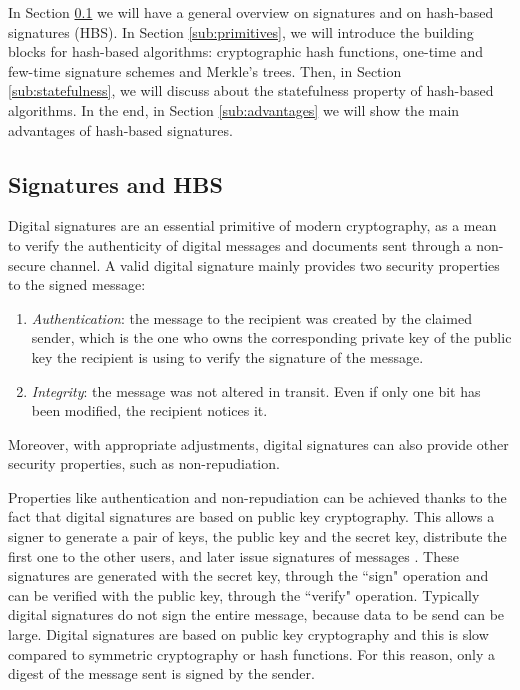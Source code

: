 \documentclass[a4paper,12pt]{article}
\begin{document}
In Section \ref{sub:hbintro} we will have a general overview on signatures and on hash-based signatures (HBS). In Section \ref{sub:primitives}, we will introduce the building blocks for hash-based algorithms: cryptographic hash functions, one-time and few-time signature schemes and Merkle's trees. Then, in Section \ref{sub:statefulness}, we will discuss about the statefulness property of hash-based algorithms. In the end, in Section \ref{sub:advantages} we will show the main advantages of hash-based signatures.


\subsection{Signatures and HBS}
\label{sub:hbintro}

Digital signatures are an essential primitive of modern cryptography, as a mean to verify the authenticity of digital messages and documents sent through a non-secure channel.
A valid digital signature mainly provides two security properties to the signed message:
\begin{enumerate}
	\item \textit{Authentication}: the message to the recipient was created by the claimed sender, which is the one who owns the corresponding private key of the public key the recipient is using to verify the signature of the message.
	\item \textit{Integrity}: the message was not altered in transit. Even if only one bit has been modified, the recipient notices it.
\end{enumerate}

Moreover, with appropriate adjustments, digital signatures can also provide other security properties, such as non-repudiation. 

Properties like authentication and non-repudiation can be achieved thanks to the fact that digital signatures are based on public key cryptography. This allows a signer to generate a pair of keys, the public key and the secret key, distribute the first one to the other users, and later issue signatures of messages \cite{7_hashbased}. These signatures are generated with the secret key, through the ``sign" operation and can be verified with the public key, through the ``verify" operation.
Typically digital signatures do not sign the entire message, because data to be send can be large. Digital signatures are based on public key cryptography and this is slow compared to symmetric cryptography or hash functions. For this reason, only a digest of the message sent is signed by the sender.
\end{document}
